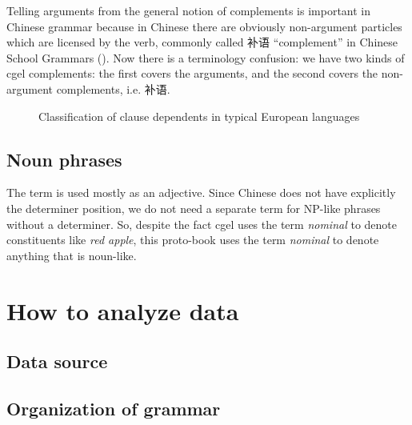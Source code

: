 \documentclass[../main.tex]{subfiles}
\begin{document}
Telling arguments from the general notion of complements is important in Chinese grammar 
because in Chinese there are obviously non-argument particles which are licensed by the verb, 
commonly called 补语 ``complement'' in Chinese School Grammars ().
Now there is a terminology confusion: we have two kinds of \ac{cgel} complements:
the first covers the arguments, and the second covers the non-argument complements, i.e. 补语.

\begin{figure}
    \centering
    
    \caption{Classification of clause dependents in typical European languages}
\end{figure}


\subsection{Noun phrases}

The term  is used mostly as an adjective. Since Chinese does not have 
explicitly the determiner position, we do not need a separate term for NP-like phrases without a determiner.
So, despite the fact \ac{cgel} uses the term \emph{nominal} to denote constituents like \emph{red apple}, 
this proto-book uses the term \emph{nominal} to denote anything that is noun-like.

\section{How to analyze data}

\subsection{Data source}


\subsection{Organization of grammar}
\end{document}
